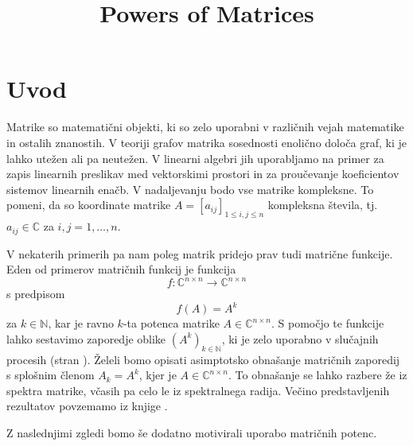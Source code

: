 \documentclass[mat1]{fmfdelo}
\title{Powers of Matrices}
\newcommand{\N}{\mathbb N}
\newcommand{\C}{\mathbb C}
\begin{document}
\section{Uvod}
Matrike so matematični objekti, ki so zelo uporabni v različnih vejah matematike in ostalih znanostih. V teoriji grafov matrika sosednosti enolično določa graf, ki je lahko utežen ali pa neutežen. V linearni algebri jih uporabljamo na primer za zapis linearnih preslikav med vektorskimi prostori in za proučevanje koeficientov sistemov linearnih enačb. V nadaljevanju bodo vse matrike kompleksne. To pomeni, da so koordinate matrike $A = [a_{ij}]_{1 \leq i,j \leq n}$ kompleksna števila, tj.\ $a_{ij} \in \C$ za $i,j = 1, \ldots, n$.

V nekaterih primerih pa nam poleg matrik pridejo prav tudi matrične funkcije. Eden od primerov matričnih funkcij je funkcija
\[f: \C^{n\times n} \rightarrow \C^{n\times n}\] s predpisom
\[f(A) = A^k\]
za $k\in\N$, kar je ravno $k$-ta potenca matrike $A\in\C^{n\times n}$. S pomočjo te funkcije lahko sestavimo zaporedje oblike $\left(A^k\right)_{k \in \N}$, ki je zelo uporabno v slučajnih procesih (stran \pageref{definicijaMarkov}). Želeli bomo opisati asimptotsko obnašanje matričnih zaporedij s splošnim členom $A_k = A^k$, kjer je $A \in \C^{n \times n}$. To obnašanje se lahko razbere že iz spektra matrike, včasih pa celo le iz spektralnega radija. Večino predstavljenih rezultatov povzemamo iz knjige \cite[2.~poglavje, 3.~poglavje, dod.~A]{kramar}.

Z naslednjimi zgledi bomo še dodatno motivirali uporabo matričnih potenc.
\end{document}
